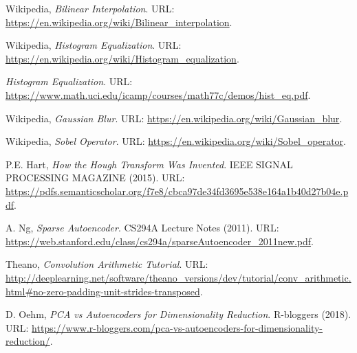 \begin{thebibliography}{3}
Wikipedia,
\emph{Bilinear Interpolation}.
URL: \url{https://en.wikipedia.org/wiki/Bilinear_interpolation}.

Wikipedia,
\emph{Histogram Equalization}.
URL: \url{https://en.wikipedia.org/wiki/Histogram_equalization}.


\emph{Histogram Equalization}.
URL: \url{https://www.math.uci.edu/icamp/courses/math77c/demos/hist_eq.pdf}.


Wikipedia,
\emph{Gaussian Blur}.
URL: \url{https://en.wikipedia.org/wiki/Gaussian_blur}.


Wikipedia,
\emph{Sobel Operator}.
URL: \url{https://en.wikipedia.org/wiki/Sobel_operator}.


P.E. Hart,
\emph{How the Hough Transform Was Invented}.
IEEE SIGNAL PROCESSING MAGAZINE
(2015).
URL: \url{https://pdfs.semanticscholar.org/f7e8/cbca97de34fd3695e538e164a1b40d27b04e.pdf}.




A. Ng,
\emph{Sparse Autoencoder}.
CS294A Lecture Notes
(2011).
URL: \url{https://web.stanford.edu/class/cs294a/sparseAutoencoder_2011new.pdf}.

Theano,
\emph{Convolution Arithmetic Tutorial}.
URL: \url{http://deeplearning.net/software/theano_versions/dev/tutorial/conv_arithmetic.html#no-zero-padding-unit-strides-transposed}.


D. Oehm,
\emph{PCA vs Autoencoders for Dimensionality Reduction}.
R-bloggers
(2018).
URL: \url{https://www.r-bloggers.com/pca-vs-autoencoders-for-dimensionality-reduction/}.


\end{thebibliography}
